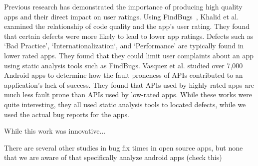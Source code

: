 \documentclass{sig-alternate}
\begin{document}
Previous research has demonstrated the importance of producing high quality apps and their direct impact on user ratings. Using FindBugs~\cite{FindBugs_URL}, Khalid et al.\cite{7006337} examined the relationship of code quality and the app's user rating. They found that certain defects were more likely to lead to lower app ratings. Defects such as `Bad Practice', `Internationalization`, and `Performance'  are typically found in lower rated apps. They found that they could limit user complaints about an app using static analysis tools such as FindBugs. Vasquez et al.\cite{linares2013api} studied over 7,000 Android apps to determine how the fault proneness of APIs contributed to an application's lack of success. They found that APIs used by highly rated apps are much less fault prone than APIs used by low-rated apps.
While these works were quite interesting, they all used static analysis tools to located defects, while we used the actual bug reports for the apps.












While this work was innovative... %




There are several other studies in bug fix times in open source apps, but none that we are aware of that specifically analyze android apps (check this) \cite{Marks:2011:SFB:2020390.2020401, Bhattacharya:2011:BTP:1985441.1985472}
\end{document}
